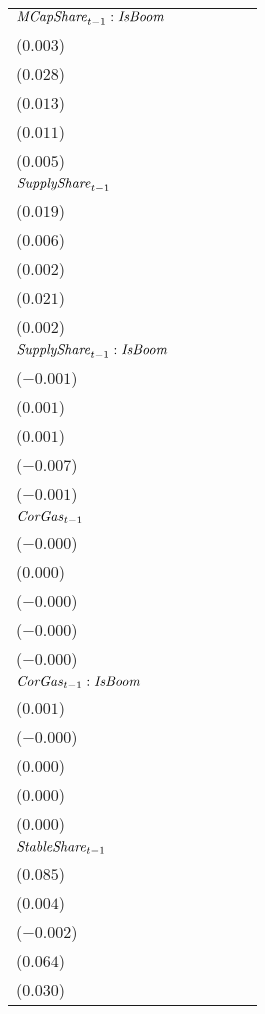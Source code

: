\begin{tabular}{llllll}
${{\it MCapShare}}_{t-1} : {\it IsBoom}$    &    \makecell{$0.007^{***}$ \\ ($0.003$)} &    \makecell{$0.033^{***}$ \\ ($0.028$)} &    \makecell{$0.018^{***}$ \\ ($0.013$)} &    \makecell{$0.013^{***}$ \\ ($0.011$)} &    \makecell{$0.005^{***}$ \\ ($0.005$)} \\
${{\it SupplyShare}}_{t-1}$                 &    \makecell{$0.037^{***}$ \\ ($0.019$)} &    \makecell{$0.006^{***}$ \\ ($0.006$)} &    \makecell{$0.003^{***}$ \\ ($0.002$)} &    \makecell{$0.022^{***}$ \\ ($0.021$)} &    \makecell{$0.001^{***}$ \\ ($0.002$)} \\
${{\it SupplyShare}}_{t-1} : {\it IsBoom}$  &     \makecell{$-0.001^{}$ \\ ($-0.001$)} &       \makecell{$0.001^{}$ \\ ($0.001$)} &      \makecell{$0.001^{*}$ \\ ($0.001$)} &  \makecell{$-0.009^{***}$ \\ ($-0.007$)} &  \makecell{$-0.002^{***}$ \\ ($-0.001$)} \\
${{\it CorGas}}_{t-1}$                      &     \makecell{$-0.000^{}$ \\ ($-0.000$)} &       \makecell{$0.000^{}$ \\ ($0.000$)} &     \makecell{$-0.000^{}$ \\ ($-0.000$)} &     \makecell{$-0.000^{}$ \\ ($-0.000$)} &     \makecell{$-0.000^{}$ \\ ($-0.000$)} \\
${{\it CorGas}}_{t-1} : {\it IsBoom}$       &     \makecell{$0.001^{**}$ \\ ($0.001$)} &     \makecell{$-0.000^{}$ \\ ($-0.000$)} &       \makecell{$0.000^{}$ \\ ($0.000$)} &       \makecell{$0.000^{}$ \\ ($0.000$)} &       \makecell{$0.000^{}$ \\ ($0.000$)} \\
${{\it StableShare}}_{t-1}$                 &    \makecell{$0.126^{***}$ \\ ($0.085$)} &     \makecell{$0.003^{**}$ \\ ($0.004$)} &   \makecell{$-0.002^{**}$ \\ ($-0.002$)} &    \makecell{$0.051^{***}$ \\ ($0.064$)} &    \makecell{$0.019^{***}$ \\ ($0.030$)} \\

\end{tabular}
